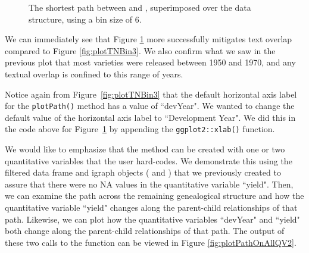 \documentclass[article,shortnames]{jss}
\begin{document}
\begin{figure}[H]
    \centering
    \caption{The shortest path between  and , superimposed over the data structure, using a bin size of 6.}
    \label{fig:plotTNBin6}
\end{figure}

\clearpage

We can immediately see that Figure \ref{fig:plotTNBin6} more successfully mitigates text overlap compared to Figure \ref{fig:plotTNBin3}. We also confirm what we saw in the previous plot that most varieties were released between 1950 and 1970, and any textual overlap is confined to this range of years.

Notice again from Figure~\ref{fig:plotTNBin3} that the default horizontal axis label for the \texttt{plotPath()} method has a value of ``devYear". We wanted to change the default value of the horizontal axis label to ``Development Year". We did this in the code above for Figure~\ref{fig:plotTNBin6} by appending the \texttt{ggplot2::xlab()} function.

We would like to emphasize that the  method can be created with one or two quantitative variables that the user hard-codes. We demonstrate this using the filtered data frame and igraph objects ( and ) that we previously created to assure that there were no NA values in the quantitative variable ``yield". Then, we can examine the path across the remaining genealogical structure and how the quantitative variable ``yield" changes along the parent-child relationships of that path. Likewise, we can plot how the quantitative variables ``devYear" and ``yield" both change along the parent-child relationships of that path. The output of these two calls to the  function can be viewed in Figure \ref{fig:plotPathOnAllQV2}.
\end{document}
